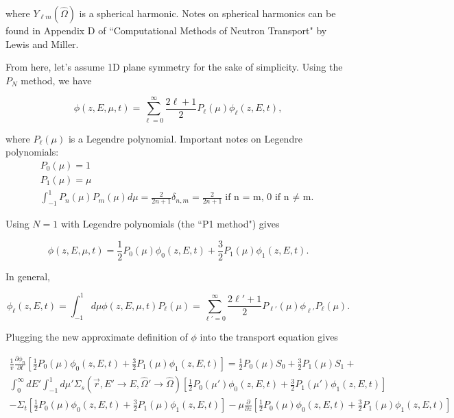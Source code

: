 \documentclass[12pt]{article}
\newcommand{\rvec}{\ensuremath{\vec{r}}}
\newcommand{\omvec}{\ensuremath{\hat{\Omega}}}
\newcommand{\sigs}{\ensuremath{\Sigma_s(\rvec,E'\rightarrow E,\omvec'\rightarrow\omvec)}}
\newcommand{\el}{\ensuremath{\ell}}
\begin{document}
where $Y_{\el m}(\omvec)$ is a spherical harmonic. Notes on spherical harmonics can be found in Appendix D
of ``Computational Methods of Neutron Transport" by Lewis and Miller.


From here, let's assume 1D plane symmetry for the sake of simplicity. Using the $P_N$ method, we have

\begin{equation*}
\phi(z,E,\mu,t) = \sum_{\el=0}^{\infty}\frac{2\el+1}{2}P_{\el}(\mu)\phi_{\el}(z,E,t),
\end{equation*}

where $P_{\ell}(\mu)$ is a Legendre polynomial. Important notes on Legendre polynomials:
\begin{gather*}
P_0(\mu) = 1 \\
P_1(\mu) = \mu \\
\int_{-1}^{1}P_n(\mu)P_m(\mu)d\mu = 
\frac{2}{2n+1}\delta_{n,m}=\frac{2}{2n+1}\text{if n = m, 0 if n $\neq$ m.}
\end{gather*}

Using $N=1$ with Legendre polynomials (the ``P1 method") gives

\begin{equation*}
\phi(z,E,\mu,t) = \frac{1}{2}P_0(\mu)\phi_0(z,E,t) + \frac{3}{2}P_1(\mu)\phi_1(z,E,t).
\end{equation*}

In general,

\begin{equation*}
\phi_{\el}(z,E,t) = \int^{1}_{-1}d\mu\phi(z,E,\mu,t)P_{\el}(\mu) 
= \sum_{\el'=0}^{\infty}\frac{2\el'+1}{2}P_{\ell'}(\mu)\phi_{\el'}P_{\ell}(\mu).
\end{equation*}

Plugging the new approximate definition of $\phi$ into the transport equation gives

\begin{multline*}
\frac{1}{v}\frac{\partial\phi_n}{\partial t}\left[\frac{1}{2}P_0(\mu)\phi_0(z,E,t) + \frac{3}{2}P_1(\mu)\phi_1(z,E,t)\right] = 
\frac{1}{2}P_0(\mu)S_0 + \frac{3}{2}P_1(\mu)S_1 + \\ 
\int^{\infty}_{0}dE'\int^{1}_{-1}d\mu'\sigs\left[\frac{1}{2}P_0(\mu')\phi_0(z,E,t) + \frac{3}{2}P_1(\mu')\phi_1(z,E,t)\right] \\
- \Sigma_t\left[\frac{1}{2}P_0(\mu)\phi_0(z,E,t) + \frac{3}{2}P_1(\mu)\phi_1(z,E,t)\right]
- \mu\frac{\partial}{\partial z}\left[\frac{1}{2}P_0(\mu)\phi_0(z,E,t) + \frac{3}{2}P_1(\mu)\phi_1(z,E,t)\right]
\end{multline*}
\end{document}
